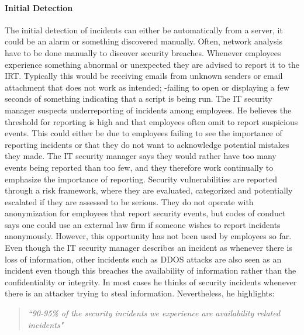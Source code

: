 \paragraph{Initial Detection}
The initial detection of incidents can either be automatically from a server, it could be an alarm or something discovered manually. Often, network analysis have to be done manually to discover security breaches. Whenever employees experience something abnormal or unexpected they are advised to report it to the \ac{IRT}. Typically this would be receiving emails from unknown senders or email attachment that does not work as intended; -failing to open or displaying a few seconds of something indicating that a script is being run.
The IT security manager suspects underreporting of incidents among employees. He believes the threshold for reporting is high and that employees often omit to report suspicious events. This could either be due to employees failing to see the importance of reporting incidents or that they do not want to acknowledge potential mistakes they made. The IT security manager says they would rather have too many events being reported than too few, and they therefore work continually to emphasize the importance of reporting.
Security vulnerabilities are reported through a risk framework, where they are evaluated, categorized and potentially escalated if they are assessed to be serious. They do not operate with anonymization for employees that report security events, but codes of conduct says one could use an external law firm if someone wishes to report incidents anonymously. However, this opportunity has not been used by employees so far. 
Even though the IT security manager describes an incident as whenever there is loss of information, other incidents such as DDOS attacks are also seen as an incident even though this breaches the availability of information rather than the confidentiality or integrity. In most cases he thinks of security incidents whenever there is an attacker trying to steal information. Nevertheless, he highlights:
\begin{quote}
\textit{``90-95\% of the security incidents we experience are availability related incidents"}
\end{quote}
